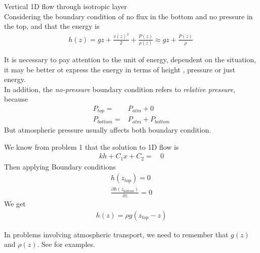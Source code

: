 \documentclass[a4paper, 11pt,article,oneside]{memoir}%
\begin{document}
\begin{exbox}{}{Vertical 1D flow through isotropic layer}\\
Considering the boundary condition of no flux in the bottom and no pressure in the top, and that the energy is 
\begin{align*}
h(z)=gz+\frac{v(z)^2}{2}+\frac{P(z)}{\rho(z)}\approx gz+\frac{P(z)}{\rho}\
\end{align*}
\begin{note}
It is necessary to pay attention to the unit of energy, dependent on the situation, it may be better ot express the energy in terms of height , pressure or just energy.\\
In addition, the \textit{no-pressure} boundary condition  refers to \textit{relative pressure}, because
\begin{align*}
P_{top}=&P_{atm}+0\\
P_{bottom}=&P_{atm}+P_{bottom}
\end{align*}
But atmospheric pressure usually affects both boundary condition. 	
\end{note}
We know from problem 1 that the solution to 1D flow  is 
\begin{align*}
kh+C_1x+C_2=& \,0
\end{align*}
Then applying Boundary conditions
\begin{align*}
h(z_{top})=0\\
\frac{\partial h(z_{bottom})}{\partial z}=0
\end{align*}
We get 
\begin{align*}
h(z)=\rho g (z_{top}-z)
\end{align*}
\begin{note}
In problems involving atmospheric transport, we need to remember that $g(z)$ and $\rho (z)$. See \cite{ICH2304} for examples.
\end{note}
\end{exbox}
\newpage
\end{document}
